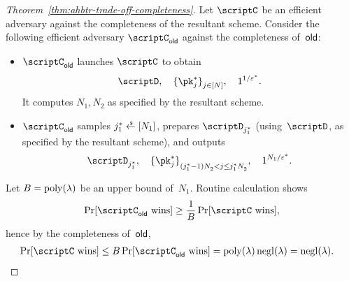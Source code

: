 \begin{proof}
[%
Theorem~\ref{thm:ahbtr-trade-off-completeness}]
Let $\scriptC$ be an efficient adversary against the completeness of the resultant scheme.
Consider the following efficient adversary $\scriptC_\OLD$ against the completeness of~$\OLD$:
\begin{itemize}
\item $\scriptC_\OLD$ launches $\scriptC$ to obtain
\begin{align*}
\scriptD,\quad
\{\pk^\ast_j\}_{j\in[N]}^\sphantom,\quad
1^{1/\epsilon^\ast}.
\end{align*}
It computes $N_1,N_2$ as specified by the resultant scheme.
\item $\scriptC_\OLD$ samples ${j^\ast_1\draws[N_1]}$,
prepares $\scriptD_{j^\ast_1}$ (using~$\scriptD$, as specified by the resultant scheme), and outputs
\begin{align*}
\scriptD_{j^\ast_1},\quad
\{\pk^\ast_j\}_{(j^\ast_1-1)N_2^\sphantom<j\leq j^\ast_1N_2^\sphantom}^\sphantom,\quad
1^{N_1/\epsilon^\ast}.
\end{align*}
\end{itemize}
Let ${B=\operatorname{poly}(\lambda)}$ be an upper bound of~$N_1$.
Routine calculation shows
\begin{align*}
\Pr[\scriptC_\OLD\textup{ wins}]
\geq
\frac{1}{B}\Pr[\scriptC\textup{ wins}],
\end{align*}
hence by the completeness of~$\OLD$,
\begin{align*}
\Pr[\scriptC\textup{ wins}]
&{}\leq
B\Pr[\scriptC_\OLD\textup{ wins}]
=
\poly(\lambda)\negl(\lambda)
=
\negl(\lambda).
\qedhere
\end{align*}
\end{proof}
